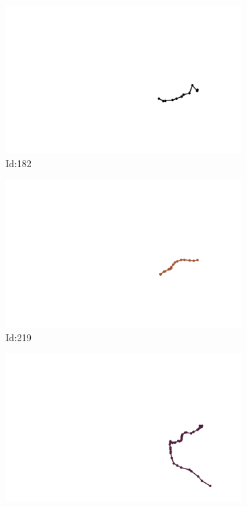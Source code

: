\documentclass[12pt,twoside]{report}
\begin{document}
\begin{figure}
\centering
\begin{subfigure}[b]{0.20\textwidth}
\centering
\includegraphics[width=\textwidth]{../../trajectories/182.png}
\caption{Id:182}
\end{subfigure}
\begin{subfigure}[b]{0.20\textwidth}
\centering
\includegraphics[width=\textwidth]{../../trajectories/219.png}
\caption{Id:219}
\end{subfigure}
\begin{subfigure}[b]{0.20\textwidth}
\centering
\includegraphics[width=\textwidth]{../../trajectories/253.png}

\end{subfigure}
\end{figure}
\end{document}
